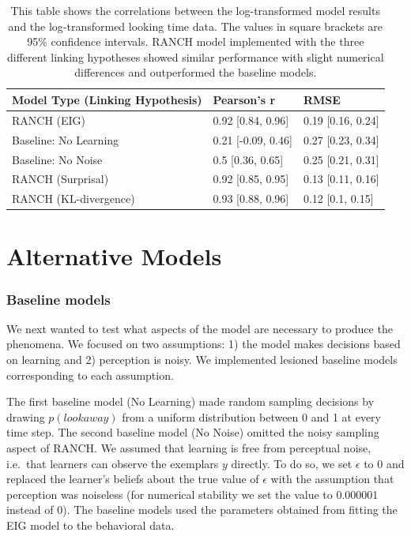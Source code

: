 \documentclass[10pt, letterpaper]{article}
\begin{document}
\begin{table}[ht]
\centering
\begingroup\fontsize{8pt}{9pt}\selectfont
\begin{tabular}{lll}
  \hline
Model Type (Linking Hypothesis) & Pearson's r & RMSE \\ 
  \hline
RANCH (EIG) & 0.92 [0.84, 0.96] & 0.19 [0.16, 0.24] \\ 
  Baseline: No Learning & 0.21 [-0.09, 0.46] & 0.27 [0.23, 0.34] \\ 
  Baseline: No Noise & 0.5 [0.36, 0.65] & 0.25 [0.21, 0.31] \\ 
  RANCH (Surprisal) & 0.92 [0.85, 0.95] & 0.13 [0.11, 0.16] \\ 
  RANCH (KL-divergence) & 0.93 [0.88, 0.96] & 0.12 [0.1, 0.15] \\ 
   \hline
\end{tabular}
\endgroup
\caption{This table shows the correlations between the log-transformed model results and the log-transformed looking time data. The values in square brackets are 95\% confidence intervals. RANCH model implemented with the three different linking hypotheses showed similar performance with slight numerical differences and outperformed the baseline models.} 
\end{table}

\hypertarget{alternative-models}{%
\section{Alternative Models}\label{alternative-models}}

\hypertarget{baseline-models}{%
\subsubsection{Baseline models}\label{baseline-models}}

We next wanted to test what aspects of the model are necessary to
produce the phenomena. We focused on two assumptions: 1) the model makes
decisions based on learning and 2) perception is noisy. We implemented
lesioned baseline models corresponding to each assumption.

The first baseline model (No Learning) made random sampling decisions by
drawing \(p(look away)\) from a uniform distribution between 0 and 1 at
every time step. The second baseline model (No Noise) omitted the noisy
sampling aspect of RANCH. We assumed that learning is free from
perceptual noise, i.e.~that learners can observe the exemplars \(y\)
directly. To do so, we set \(\epsilon\) to 0 and replaced the learner's
beliefs about the true value of \(\epsilon\) with the assumption that
perception was noiseless (for numerical stability we set the value to
0.000001 instead of 0). The baseline models used the parameters obtained
from fitting the EIG model to the behavioral data.
\end{document}
